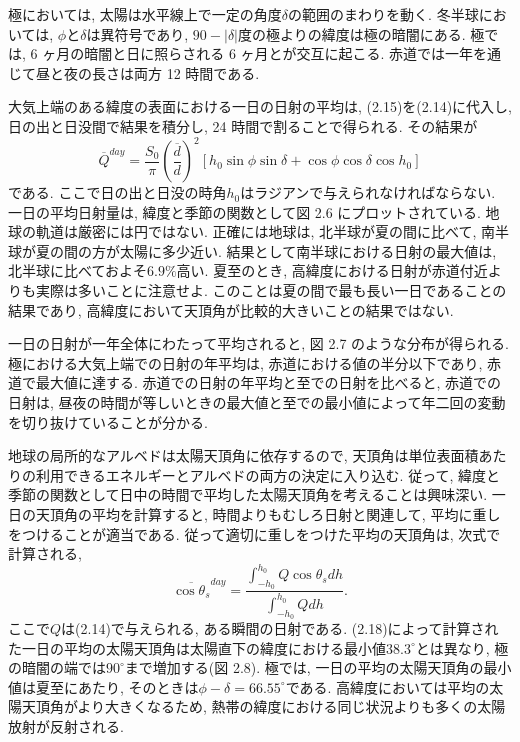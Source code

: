 \documentclass[a4j,12pt,openbib,oneside,dvipdfmx]{jbook}
\begin{document}
極においては, 太陽は水平線上で一定の角度$\delta$の範囲のまわりを動く.
冬半球においては, $\phi$と$\delta$は異符号であり, $90-|\delta|$度の極よりの緯度は極の暗闇にある.
極では, 6 ヶ月の暗闇と日に照らされる 6 ヶ月とが交互に起こる. 赤道では一年を通じて昼と夜の長さは両方 12 時間である.
\par
大気上端のある緯度の表面における一日の日射の平均は, (2.15)を(2.14)に代入し, 日の出と日没間で結果を積分し, 24 時間で割ることで得られる. 
その結果が
\begin{equation}
  \overline{Q}^{day}=\frac{S_0}{\pi}\left(\frac{\overline{d}}{d}\right)^2\left[h_0\sin\phi\sin\delta+\cos\phi\cos\delta\cos{h_0}\right]
\end{equation}
である. ここで日の出と日没の時角$h_0$はラジアンで与えられなければならない. 一日の平均日射量は, 緯度と季節の関数として図 2.6 にプロットされている.
地球の軌道は厳密には円ではない. 正確には地球は, 北半球が夏の間に比べて, 南半球が夏の間の方が太陽に多少近い. 
結果として南半球における日射の最大値は, 北半球に比べておよそ$6.9\%$高い.
夏至のとき, 高緯度における日射が赤道付近よりも実際は多いことに注意せよ.
このことは夏の間で最も長い一日であることの結果であり, 高緯度において天頂角が比較的大きいことの結果ではない.
\par
一日の日射が一年全体にわたって平均されると, 図 2.7 のような分布が得られる.
極における大気上端での日射の年平均は, 赤道における値の半分以下であり, 赤道で最大値に達する. 赤道での日射の年平均と至での日射を比べると, 赤道での日射は, 昼夜の時間が等しいときの最大値と至での最小値によって年二回の変動を切り抜けていることが分かる.
\par
地球の局所的なアルベドは太陽天頂角に依存するので, 天頂角は単位表面積あたりの利用できるエネルギーとアルベドの両方の決定に入り込む. 
従って, 緯度と季節の関数として日中の時間で平均した太陽天頂角を考えることは興味深い.
一日の天頂角の平均を計算すると, 時間よりもむしろ日射と関連して, 平均に重しをつけることが適当である. 
従って適切に重しをつけた平均の天頂角は, 次式で計算される,
\begin{equation}
  \overline{\cos{\theta_s}}^{day}=\frac{\int_{-h_0}^{h_0} Q\cos{\theta_s}dh}{\int_{-h_0}^{h_0} Qdh }.
\end{equation}
ここで$Q$は(2.14)で与えられる, ある瞬間の日射である.
(2.18)によって計算された一日の平均の太陽天頂角は太陽直下の緯度における最小値$38.3^\circ$とは異なり, 極の暗闇の端では$90^\circ$まで増加する(図 2.8).
極では, 一日の平均の太陽天頂角の最小値は夏至にあたり, そのときは$\phi-\delta=66.55^\circ$である.
高緯度においては平均の太陽天頂角がより大きくなるため, 熱帯の緯度における同じ状況よりも多くの太陽放射が反射される.
\end{document}
